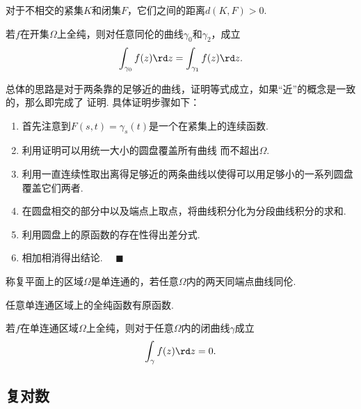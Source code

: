   \begin{lemma}
    \label{lemma: 紧集、闭集、距离}
    对于不相交的紧集$K$和闭集$F$，它们之间的距离$d(K, F)>0$.
  \end{lemma}

  \begin{thm}
    若$f$在开集$\Omega$上全纯，则对任意同伦的曲线$\gamma_0$和$\gamma_2$，成立
    \[
      \int_{\gamma_0}f(z)\rd z = \int_{\gamma_1}f(z)\rd z.
    \]
  \end{thm}
  \proof
    总体的思路是对于两条靠的足够近的曲线，证明等式成立，如果“近”的概念是一致的，那么即完成了
    证明. 具体证明步骤如下：
    \begin{enumerate}
      \item 首先注意到$F(s, t)=\gamma_s(t)$是一个在紧集上的连续函数.
      \item 利用证明可以用统一大小的圆盘覆盖所有曲线
        而不超出$\Omega$.
      \item 利用一直连续性取出离得足够近的两条曲线以使得可以用足够小的一系列圆盘覆盖它们两者.
      \item 在圆盘相交的部分中以及端点上取点，将曲线积分化为分段曲线积分的求和.
      \item 利用圆盘上的原函数的存在性得出差分式.
      \item 相加相消得出结论. $\quad\blacksquare$
    \end{enumerate}

  \begin{defi}[单连通]
    称复平面上的区域$\Omega$是单连通的，若任意$\Omega$内的两天同端点曲线同伦.
  \end{defi}

  \begin{thm}
    任意单连通区域上的全纯函数有原函数.
  \end{thm}

  \begin{thm}[Cauchy]
    若$f$在单连通区域$\Omega$上全纯，则对于任意$\Omega$内的闭曲线$\gamma$成立
    \[
      \int_\gamma f(z)\rd z = 0.
    \]
  \end{thm}


\subsection{复对数}

